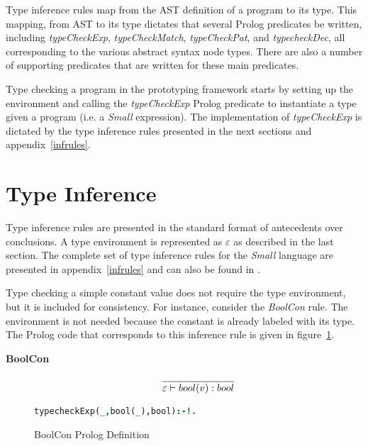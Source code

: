 \documentclass[10pt]{luthercs}
\begin{document}
Type inference rules map from the AST definition of a program to its type. This mapping, from AST to its type dictates that several Prolog predicates be written, including {\em typeCheckExp}, {\em typeCheckMatch}, {\em typeCheckPat}, and {\em typecheckDec}, all corresponding to the various abstract syntax node types. There are also a number of supporting predicates that are written for these main predicates. 

Type checking a program in the prototyping framework starts by setting up the environment and calling the {\em typeCheckExp} Prolog predicate to instantiate a type given a program (i.e. a {\em Small} expression). The implementation of {\em typeCheckExp} is dictated by the type inference rules presented in the next sections and appendix~\ref{infrules}.


\section{Type Inference}

Type inference rules are presented in the standard format of antecedents over conclusions. A type environment is represented as $\varepsilon$ as described in the last section. The complete set of type inference rules for the {\em Small} language are presented in appendix~\ref{infrules} and can also be found in \cite{leepl}. 

Type checking a simple constant value does not require the type environment, but it is included for consistency. For instance, consider the {\em BoolCon} rule. The environment is not needed because the constant is already labeled with its type. The Prolog code that corresponds to this inference rule is given in figure~\ref{boolcon}.

\begin{description}
\item[{\textbf{BoolCon}}] \begin{gather}
\begin{split}\frac{}{\varepsilon\vdash bool(v) : bool}\end{split}\notag
\end{gather}
\end{description}


\begin{figure}[htbp]
\begin{lstlisting}[language=Prolog]
typecheckExp(_,bool(_),bool):-!.
\end{lstlisting}
\caption{BoolCon Prolog Definition}
\label{boolcon}
\end{figure}
\end{document}
